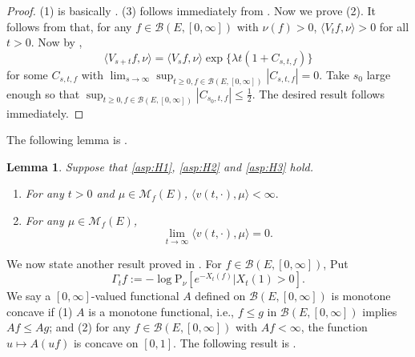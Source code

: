 \documentclass[12pt,a4paper]{amsart}
\numberwithin{equation}{section}
\theoremstyle{plain}
\newtheorem{lem}[thm]{Lemma}
\theoremstyle{definition}
\theoremstyle{remark}
\begin{document}
\begin{proof}
(1) is basically \cite[(3.20)]{LiuRenSongSun2020}. 
	(3) follows immediately from
	\cite[(3.20) and Proposition 1.4]{LiuRenSongSun2020}. 
	Now we prove (2).
	It follows from\cite[(3.4)]{LiuRenSongSun2020} 
	that, for any $f\in\mathcal B(E,[0,\infty])$ with $\nu(f)>0$, $\langle V_{t}f, \nu\rangle>0$ for all $t>0$. 
	Now by \cite[(3.20)]{LiuRenSongSun2020},
	$$
	\langle V_{s+t}f, \nu\rangle=\langle V_{s}f, \nu\rangle\exp\{\lambda t(1+C_{s, t, f})\}
	$$
	for some $C_{s, t, f}$ with $\lim_{s\to\infty}\sup_{t\ge 0, f\in \mathcal B(E,[0,\infty])}|C_{s, t, f}|=0$. Take $s_0$ large enough so that $\sup_{t\ge 0, f\in \mathcal B(E,[0,\infty])}|C_{s_0, t, f}|\le \frac12$. The desired result follows immediately.
\end{proof}

The following lemma is \cite[Proposition 2.2]{LiuRenSongSun2020}.
\begin{lem}\label{lem:extinc}
	Suppose that  \eqref{asp:H1}, \eqref{asp:H2} and \eqref{asp:H3} hold.
	\begin{enumerate}
		\item	
		For any  $ t>0$ and $ \mu \in \mathcal M_f(E)$, $\langle v(t,\cdot),\mu\rangle <\infty.$
		\item	For any $\mu \in \mathcal M_f(E)$,
		\[
		\lim_{t\rightarrow\infty}\langle v(t,\cdot),\mu\rangle=0.
		\]
	\end{enumerate}
\end{lem}

We now state another result
proved in \cite{LiuRenSongSun2020}. For $f\in \mathcal B(E, [0,\infty])$, Put
$$
\Gamma_t f:=-\log \mathrm P_{\nu}[e^{-X_t(f)}|X_t(1)>0].
$$
We say a $[0,\infty]$-valued functional $A$ defined on $\mathcal B(E,[0,\infty])$ is monotone concave if
	(1) $A$ is a monotone functional, i.e., $f\leq g$ in $\mathcal B(E,[0,\infty])$ implies $Af \leq Ag$; and
	(2) for any $f\in \mathcal B(E,[0,\infty])$ with $Af< \infty$, the function $u \mapsto A(uf)$ is concave on $[0,1]$.
The following result is \cite[Propositions 2.3 and 2.7]{LiuRenSongSun2020}.
\end{document}
